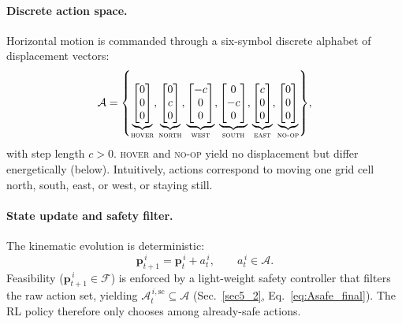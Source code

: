 \documentclass[drones,article,accept,pdftex,moreauthors]{Definitions/mdpi}
\begin{document}
\paragraph{Discrete action space.}
Horizontal motion is commanded through a six-symbol discrete alphabet of
displacement vectors:
\begin{equation}
\mathcal{A} =
\left\{
\underbrace{\begin{bmatrix} 0\\ 0\\ 0 \end{bmatrix}}_{\textsc{hover}},
\underbrace{\begin{bmatrix} 0\\ c\\ 0 \end{bmatrix}}_{\textsc{north}},
\underbrace{\begin{bmatrix} -c\\ 0\\ 0 \end{bmatrix}}_{\textsc{west}},
\underbrace{\begin{bmatrix} 0\\ -c\\ 0 \end{bmatrix}}_{\textsc{south}},
\underbrace{\begin{bmatrix} c\\ 0\\ 0 \end{bmatrix}}_{\textsc{east}},
\underbrace{\begin{bmatrix} 0\\ 0\\ 0 \end{bmatrix}}_{\textsc{no-op}}
\right\},
\label{eq:action}
\end{equation}
with step length \(c>0\). \textsc{hover} and \textsc{no-op} yield no displacement but differ
energetically (below). Intuitively, actions correspond to moving one grid cell north,
south, east, or west, or staying still.

\paragraph{State update and safety filter.}
The kinematic evolution is deterministic:
\begin{equation}
\mathbf{p}_{t+1}^{\,i} = \mathbf{p}_t^{\,i} + a_t^{\,i}, \qquad a_t^{\,i} \in \mathcal{A}.
\label{eq:state}
\end{equation}
Feasibility (\(\mathbf{p}_{t+1}^{\,i}\in\mathcal{F}\)) is enforced by a light-weight safety
controller that filters the raw action set, yielding
\(\mathcal{A}_t^{\,i,\mathrm{sc}}\subseteq\mathcal{A}\) (Sec.~\ref{sec5_2},
Eq.~\eqref{eq:Asafe_final}). The RL policy therefore only chooses among
already-safe actions.
\end{document}
